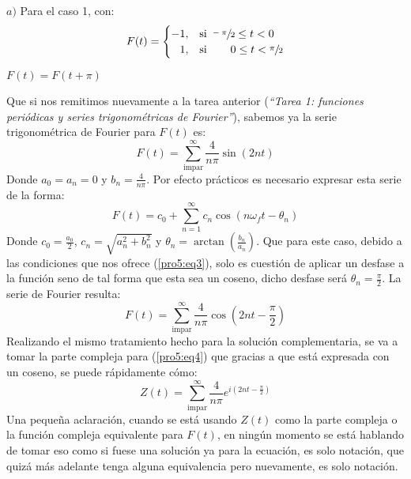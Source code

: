 \begin{multicols}{2}
$a)$ Para el caso 1, con:
\begin{equation*}
    F(t) =
    \begin{cases}
    -1,&\text{si } \sfrac{-\pi}{2} \leq t < 0\\
    \hphantom{-}1,&\text{si } \hspace{18pt} 0 \leq t < \sfrac{\pi}{2}
    \end{cases}
\end{equation*}
\begin{center}$F(t)=F(t+\pi)$\end{center}
Que si nos remitimos nuevamente a la tarea anterior (\textit{``Tarea 1: funciones periódicas y series trigonométricas de Fourier''}), sabemos ya la serie trigonométrica de Fourier para $F(t)$ es:
\begin{equation}
    F(t) = \sum_{\mathrm{impar}}^{\infty} \frac{4}{n\pi} \sin\left(2nt\right)\label{pro5:eq3}
\end{equation}
Donde $a_0 = a_n = 0$ y $b_n = \frac{4}{n\pi}$. Por efecto prácticos es necesario expresar esta serie de la forma:
\begin{equation*}
    F(t) = c_0 + \sum_{n=1}^{\infty} c_n \cos\left(n\omega_f t - \theta_n\right) 
\end{equation*}
Donde $c_0 = \frac{a_0}{2}$, $c_n = \sqrt{a_{n}^{2} + b_{n}^{2}}$ y $\theta_n = \arctan\left(\frac{b_n}{a_n}\right)$. Que para este caso, debido a las condiciones que nos ofrece (\ref{pro5:eq3}), solo es cuestión de aplicar un desfase a la función seno de tal forma que esta sea un coseno, dicho desfase será $\theta_n = \frac{\pi}{2}$. La serie de Fourier resulta:
\begin{equation}
    F(t) = \sum_{\mathrm{impar}}^{\infty} \frac{4}{n\pi} \cos\left(2nt - \frac{\pi}{2}\right) \label{pro5:eq4}
\end{equation}
Realizando el mismo tratamiento hecho para la solución complementaria, se va a tomar la parte compleja para (\ref{pro5:eq4}) que gracias a que está expresada con un coseno, se puede rápidamente cómo:
\begin{equation}
    Z(t) = \sum_{\mathrm{impar}}^{\infty} \frac{4}{n\pi} e^{i\left(2nt - \frac{\pi}{2}\right)} \label{pro5:eq5}
\end{equation}
Una pequeña aclaración, cuando se está usando $Z(t)$ como la parte compleja o la función compleja equivalente para $F(t)$, en ningún momento se está hablando de tomar eso como si fuese una solución ya para la ecuación, es solo notación, que quizá más adelante tenga alguna equivalencia pero nuevamente, es solo notación.


\end{multicols}
